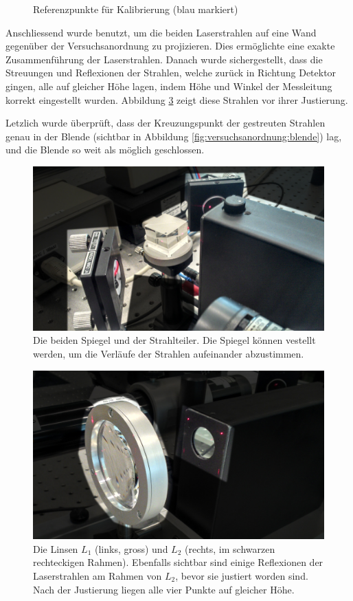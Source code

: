 \begin{figure}[h!t]
    \centering
    \resizebox{.67\textwidth}{!}{}
    \caption{%
        Referenzpunkte f\"ur Kalibrierung (blau markiert)
    }
    \label{fig:justierung}
\end{figure}

Anschliessend wurde
benutzt,   um   die   beiden   Laserstrahlen   auf   eine   Wand   gegen\"uber
der   Versuchsanordnung  zu   projizieren. Dies   erm\"oglichte  eine   exakte
Zusammenf\"uhrung  der Laserstrahlen. Danach  wurde  sichergestellt, dass  die
Streuungen und Reflexionen der Strahlen,  welche zur\"uck in Richtung Detektor
gingen,  alle  auf  gleicher  H\"ohe   lagen,  indem  H\"ohe  und  Winkel  der
Messleitung korrekt eingestellt wurden. Abbildung \ref{fig:lensL1} zeigt diese
Strahlen vor ihrer Justierung.

Letzlich wurde \"uberpr\"uft, dass  der Kreuzungspunkt der gestreuten Strahlen
genau in der Blende (sichtbar in Abbildung \ref{fig:versuchsanordnung:blende})
lag, und die Blende so weit als m\"oglich geschlossen.

\begin{figure}[h!t]
    \centering
    \includegraphics[width=.67\textwidth]{images/spiegel.jpeg}
    \caption{%
        Die beiden Spiegel und der Strahlteiler. Die Spiegel k\"onnen vestellt
        werden, um die Verl\"aufe der Strahlen aufeinander abzustimmen.
    }
    \label{fig:spiegel}
\end{figure}


\begin{figure}[h!t]
    \centering
    \includegraphics[width=.67\textwidth]{images/linse.jpeg}
    \caption{%
        Die  Linsen  $L_1$ (links,  gross)  und  $L_2$ (rechts,  im  schwarzen
        rechteckigen  Rahmen). Ebenfalls  sichtbar   sind  einige  Reflexionen
        der  Laserstrahlen am  Rahmen  von $L_2$,  bevor  sie justiert  worden
        sind. Nach der Justierung liegen alle vier Punkte auf gleicher H\"ohe.
    }
    \label{fig:lensL1}
\end{figure}

